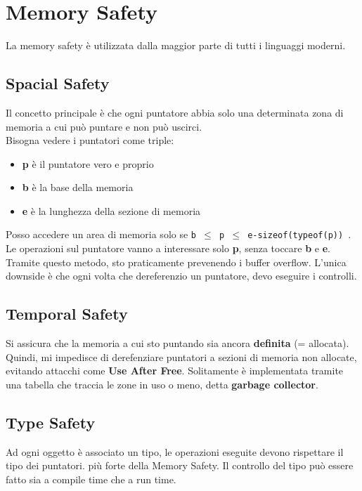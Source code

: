 \documentclass[a4paper,12pt]{article}
\begin{document}
\section{Memory Safety}

La memory safety è utilizzata dalla maggior parte di tutti i linguaggi moderni.


\subsection{Spacial Safety}
Il concetto principale è che ogni puntatore abbia solo una determinata zona di memoria a cui può puntare e non può uscirci.\\
Bisogna vedere i puntatori come triple:
\begin{itemize}
\item \textbf{p} è il puntatore vero e proprio
\item \textbf{b} è la base della memoria
\item \textbf{e} è la lunghezza della sezione di memoria
\end{itemize}

Posso accedere un area di memoria solo se \texttt{b $\leq$ p $\leq$ e-sizeof(typeof(p)) }. Le operazioni sul puntatore vanno a interessare solo \textbf{p}, senza toccare \textbf{b} e \textbf{e}. Tramite questo metodo, sto praticamente prevenendo i buffer overflow. L'unica downside è che ogni volta che dereferenzio un puntatore, devo eseguire i controlli.

\subsection{Temporal Safety}
Si assicura che la memoria a cui sto puntando sia ancora \textbf{definita} (= allocata). Quindi, mi impedisce di derefenziare puntatori a sezioni di memoria non allocate, evitando attacchi come \textbf{Use After Free}. Solitamente è implementata tramite una tabella che traccia le zone in uso o meno, detta \textbf{garbage collector}.

\subsection{Type Safety}
Ad ogni oggetto è associato un tipo, le operazioni eseguite devono rispettare il tipo dei puntatori. \E più forte della Memory Safety. Il controllo del tipo può essere fatto sia a compile time che a run time.
\end{document}

